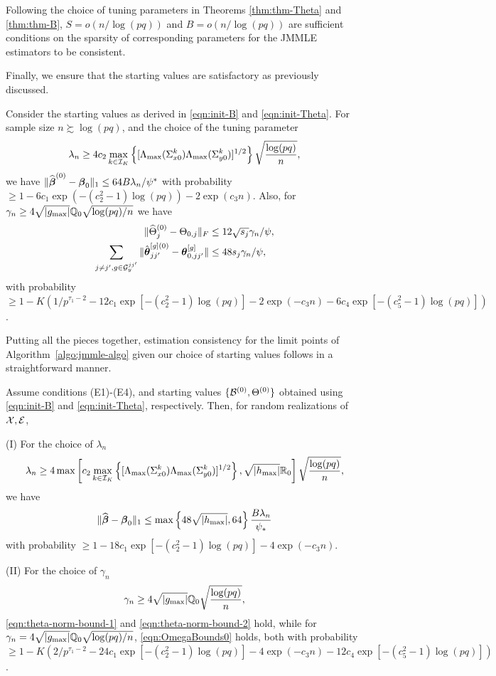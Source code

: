 Following the choice of tuning parameters in Theorems \ref{thm:thm-Theta} and \ref{thm:thm-B}, $S = o(n/\log (pq))$ and $B = o(n/\log (pq))$ are sufficient conditions on the sparsity of corresponding parameters for the JMMLE estimators to be consistent.

Finally, we ensure that the starting values are satisfactory as previously discussed.

\begin{theorem}\label{thm:starting-values}
Consider the starting values as derived in \eqref{eqn:init-B} and \eqref{eqn:init-Theta}. For sample size $n \succsim \log(pq)$, and the choice of the tuning parameter
%
\[
\lambda_n \geq 4 c_2 \max_{k \in {\cal{I}}_K} \left\{ [\Lambda_{\max} (\Sigma_{x 0}^k) \Lambda_{\max} (\Sigma_{y 0}^k)]^{1/2} \right\}
\sqrt{ \frac{\log (pq)}{n}},
\]
%
we have $\| \widehat {{\boldsymbol{\beta}}}^{(0)} - {\boldsymbol{\beta}}_0 \|_1 \leq 64 B \lambda_n /\psi^*$ with probability $\geq 1 - 6c_1 \exp( -(c_2^2-1) \log(pq)) - 2 \exp(c_3 n)$. Also, for $\gamma_n \geq 4\sqrt{| g_{\max}|} {\mathbb{Q}}_0 \sqrt{ \log (pq)/n}$ we have
%
\begin{align*}
\| \widehat \Theta_j^{(0)} - \Theta_{0,j} \|_F & \leq 12 \sqrt{s_j} \gamma_n / \psi,\\
\sum_{j \neq j', g \in {\cal{G}}_y^{jj'}} \| \hat {{\boldsymbol{\theta}}}_{jj'}^{[g](0)} - {\boldsymbol{\theta}}_{0,jj'}^{[g]} \| & \leq 48 s_j \gamma_n / \psi,
\end{align*}
%
with probability $\geq 1 - K(1/p^{\tau_1-2} - 12 c_1 \exp [-(c_2^2-1) \log(pq)] - 2 \exp (- c_3 n) - 6c_4 \exp [-(c_5^2-1) \log(pq)])$.
\end{theorem}
%

Putting all the pieces together, estimation consistency for the limit points of Algorithm~\ref{algo:jmmle-algo} given our choice of starting values follows in a straightforward manner.

\begin{corollary}\label{corollary:jmmle-final}
Assume conditions (E1)-(E4), and starting values $\{ {\cal{B}}^{(0)}, \Theta^{(0)} \}$ obtained using \eqref{eqn:init-B} and \eqref{eqn:init-Theta}, respectively. Then, for random realizations of ${\cal{X}}, {\cal{E}}$,
%

\vspace{1em}
\noindent (I) For the choice of $\lambda_n$
%
$$
\lambda_n \geq 4 \max \left[ c_2 \max_{k \in {\cal{I}}_K} \left\{ [\Lambda_{\max} (\Sigma_{x 0}^k) \Lambda_{\max} (\Sigma_{y 0}^k)]^{1/2} \right\}, \sqrt{| h_{\max}|} {\mathbb{R}}_0 \right] \sqrt{\frac{\log(pq)}{n}},
$$
%
we have
%
$$
\| \widehat {{\boldsymbol{\beta}}} - {\boldsymbol{\beta}}_0 \|_1 \leq \max \left\{ 48 \sqrt{ | h_{\max} |}, 64 \right\} \frac{B \lambda_n}{\psi_*}
$$
%
with probability $\geq 1 - 18 c_1 \exp[-(c_2^2-1) \log(pq)] - 4 \exp( -c_3 n)$.

\vspace{1em}
\noindent (II) For the choice of $\gamma_n$
%
$$
\gamma_n \geq 4 \sqrt{ | g_{\max} |} {\mathbb{Q}}_0 \sqrt{\frac{\log(pq)}{n}},
$$
%
\eqref{eqn:theta-norm-bound-1} and \eqref{eqn:theta-norm-bound-2} hold, while for $\gamma_n = 4 \sqrt{ | g_{\max} |} {\mathbb{Q}}_0 \sqrt{ \log (pq)/n}$, \eqref{eqn:OmegaBounds0} holds, both with probability $\geq 1 - K(2/p^{\tau_1-2} - 24 c_1 \exp [-(c_2^2-1) \log(pq)] - 4 \exp (- c_3 n) - 12 c_4 \exp [-(c_5^2-1) \log(pq)])$.
\end{corollary}

